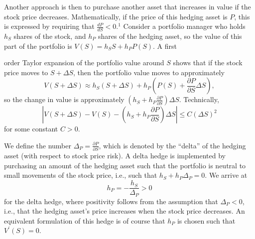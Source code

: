 \documentclass{article}
\begin{document}
Another approach is then to purchase another asset that increases in value if the stock price decreases. Mathematically, if the price of this hedging asset is $P$, this is expressed by requiring that $\frac{d P}{d S}<0 .^{1}$ Consider a portfolio manager who holds $h_{S}$ shares of the stock, and $h_{P}$ shares of the hedging asset, so the value of this part of the portfolio is $V(S)=h_{S} S+h_{P} P(S)$. A first

 order Taylor expansion of the portfolio value around $S$ shows that if the stock price moves to $S+\Delta S$, then the portfolio value moves to approximately 
\[
V(S+\Delta S) \approx h_{S}(S+\Delta S)+ h_{P}\left(P(S)+\frac{\partial P}{\partial S} \Delta S\right),
\]
so the change in value is approximately $\left(h_{S}+h_{P} \frac{\partial P}{\partial S}\right) \Delta S$. Technically,
\[
\left|V(S+\Delta S)-V(S)-\left(h_{S}+h_{P} \frac{\partial P}{\partial S}\right) \Delta S\right| \leq C(\Delta S)^{2}
\]
for some constant $C>0$.

We define the number $\Delta_{P}=\frac{\partial P}{\partial S}$, which is denoted by the ``delta'' of the hedging asset (with respect to stock price risk). A delta hedge is implemented by purchasing an amount of the hedging asset such that the portfolio is neutral to small movements of the stock price, i.e., such that $h_{S}+h_{P} \Delta_{P}=0$. We arrive at
\[
h_{P}=-\frac{h_{S}}{\Delta_{P}}>0
\]
for the delta hedge, where positivity follows from the assumption that $\Delta_{P}<0$, i.e., that the hedging asset's price increases when the stock price decreases. An equivalent formulation of this hedge is of course that $h_{P}$ is chosen such that $V^{\prime}(S)=0$.
\end{document}
